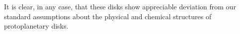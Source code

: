 It is clear, in any case, that these disks show appreciable deviation from our standard assumptions about the physical and chemical structures of protoplanetary disks.













